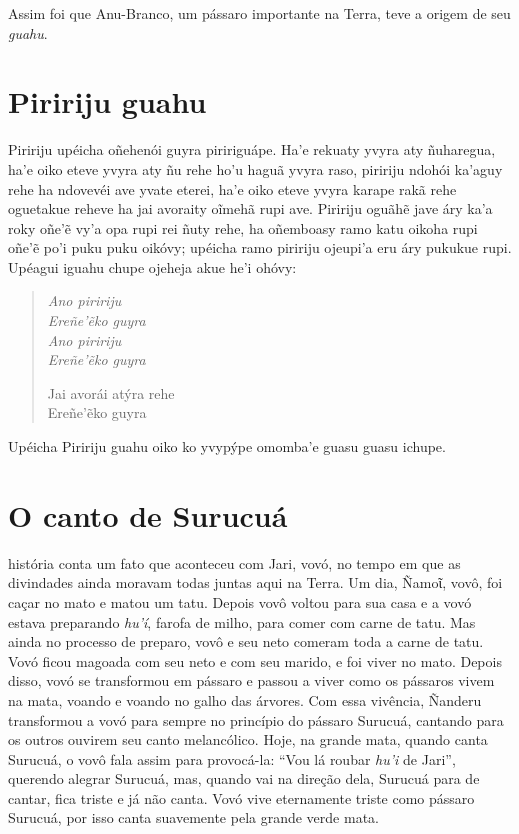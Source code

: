 Assim foi que Anu-Branco, um pássaro importante na Terra, teve a origem
de seu \emph{guahu}.

\chapter{Piririju guahu}

 Piririju upéicha oñehenói guyra piririguápe. Ha'e rekuaty yvyra
aty ñuharegua, ha'e oiko eteve yvyra aty ñu rehe ho'u haguã yvyra raso,
piririju ndohói ka'aguy rehe ha ndovevéi ave yvate eterei, ha'e oiko
eteve yvyra karape rakã rehe oguetakue reheve ha jai avoraity oĩmehã
rupi ave. Piririju oguãhẽ jave áry ka'a roky oñe'ẽ vy'a opa rupi rei
ñuty rehe, ha oñemboasy ramo katu oikoha rupi oñe'ẽ po'i puku puku
oikóvy; upéicha ramo piririju ojeupi'a eru áry pukukue rupi. Upéagui
iguahu chupe ojeheja akue he'i ohóvy:

\begin{verse}
\itshape
\emph{Ano piririju}\\
Ereñe'ẽko guyra\\
\emph{Ano piririju}\\
Ereñe'ẽko guyra
       
Jai avorái atýra rehe\\
Ereñe'ẽko guyra
\end{verse}

Upéicha Piririju guahu oiko ko yvypýpe omomba'e guasu guasu ichupe.

\chapter{O canto de Surucuá}

 história conta um fato que aconteceu com Jari, vovó, no
tempo em que as divindades ainda moravam todas juntas aqui na Terra. Um
dia, Ñamoῖ, vovô, foi caçar no mato e matou um tatu. Depois vovô
voltou para sua casa e a vovó estava preparando \emph{hu'í}, farofa de
milho, para comer com carne de tatu. Mas ainda no processo de preparo,
vovô e seu neto comeram toda a carne de tatu. Vovó ficou magoada com seu
neto e com seu marido, e foi viver no mato. Depois disso, vovó se
transformou em pássaro e passou a viver como os pássaros vivem na mata,
voando e voando no galho das árvores. Com essa vivência, Ñanderu
transformou a vovó para sempre no princípio do pássaro Surucuá, cantando
para os outros ouvirem seu canto melancólico. Hoje, na grande mata,
quando canta Surucuá, o vovô fala assim para provocá-la: ``Vou lá roubar
\emph{hu'i} de Jari'', querendo alegrar Surucuá, mas, quando vai na
direção dela, Surucuá para de cantar, fica triste e já não canta. Vovó
vive eternamente triste como pássaro Surucuá, por isso canta suavemente
pela grande verde mata.

